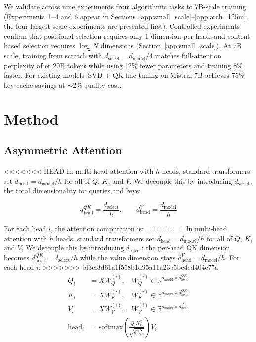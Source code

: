 \documentclass[11pt]{article}
\newcommand{\dmodel}{d_{\text{model}}}
\newcommand{\dselect}{d_{\text{select}}}
\newcommand{\dhead}{d_{\text{head}}}
\newcommand{\softmax}{\text{softmax}}
\begin{document}
We validate across nine experiments from algorithmic tasks to 7B-scale training (Experiments~1--4 and 6 appear in Sections~\ref{app:small_scale}--\ref{app:arch_125m}; the four largest-scale experiments are presented first). Controlled experiments confirm that positional selection requires only 1 dimension per head, and content-based selection requires $\log_2 N$ dimensions (Section~\ref{app:small_scale}). At 7B scale, training from scratch with $\dselect = \dmodel/4$ matches full-attention perplexity after 20B tokens while using 12\% fewer parameters and training 8\% faster. For existing models, SVD + QK fine-tuning on Mistral-7B achieves 75\% key cache savings at $\sim$2\% quality cost.


\section{Method}

\subsection{Asymmetric Attention}

<<<<<<< HEAD
In multi-head attention with $h$ heads, standard transformers set $\dhead = \dmodel / h$ for all of $Q$, $K$, and $V$. We decouple this by introducing $d_{\text{select}}$, the total dimensionality for queries and keys:

\begin{equation}
d_{\text{head}}^{QK} = \frac{\dselect}{h}, \qquad d_{\text{head}}^{V} = \frac{\dmodel}{h}
\end{equation}

For each head $i$, the attention computation is:
=======
In multi-head attention with $h$ heads, standard transformers set $\dhead = \dmodel / h$ for all of $Q$, $K$, and $V$. We decouple this by introducing $\dselect$: the per-head QK dimension becomes $d_{\text{head}}^{QK} = \dselect / h$ while the value dimension stays $d_{\text{head}}^{V} = \dmodel / h$. For each head $i$:
>>>>>>> bf3cf3d61a1f558b1d95a11a23b5be4ed404e77a
\begin{align}
Q_i &= XW_Q^{(i)}, \quad W_Q^{(i)} \in \mathbb{R}^{\dmodel \times d_{\text{head}}^{QK}} \\
K_i &= XW_K^{(i)}, \quad W_K^{(i)} \in \mathbb{R}^{\dmodel \times d_{\text{head}}^{QK}} \\
V_i &= XW_V^{(i)}, \quad W_V^{(i)} \in \mathbb{R}^{\dmodel \times d_{\text{head}}^{V}} \\
\text{head}_i &= \softmax\!\left(\frac{Q_i K_i^\top}{\sqrt{d_{\text{head}}^{QK}}}\right) V_i
\end{align}
\end{document}
